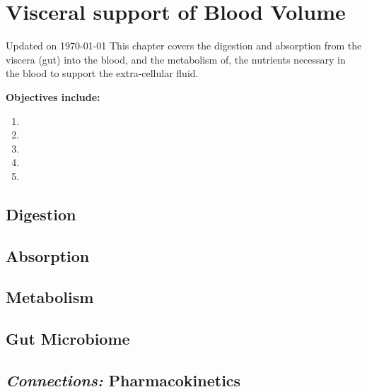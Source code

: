 \chapter{Visceral support of Blood Volume}\label{chp:blood_nutrients}
Updated on \today
\minitoc
This chapter covers the digestion and absorption from the viscera (gut) into the blood, and the metabolism of, the nutrients necessary in the blood to support the extra-cellular fluid. 

\vspace{5mm}

\textbf{Objectives include:}
\begin{enumerate}
    \item
    \item
    \item
    \item
    \item
\end{enumerate}

\section{Digestion}

\section{Absorption}

\section{Metabolism}

\section{Gut Microbiome}

\section{\textit{Connections:} Pharmacokinetics}


\printbibliography[heading=subbibintoc]